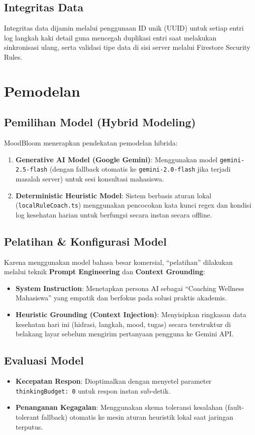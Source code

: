 \documentclass[12pt,a4paper]{article}
\begin{document}
\subsection{Integritas Data}
Integritas data dijamin melalui penggunaan ID unik (UUID) untuk setiap entri log langkah kaki detail guna mencegah duplikasi entri saat melakukan sinkronisasi ulang, serta validasi tipe data di sisi server melalui Firestore Security Rules.

\section{Pemodelan}

\subsection{Pemilihan Model (Hybrid Modeling)}
MoodBloom menerapkan pendekatan pemodelan hibrida:
\begin{enumerate}
    \item \textbf{Generative AI Model (Google Gemini)}: Menggunakan model \texttt{gemini-2.5-flash} (dengan fallback otomatis ke \texttt{gemini-2.0-flash} jika terjadi masalah server) untuk sesi konsultasi mahasiswa.
    \item \textbf{Deterministic Heuristic Model}: Sistem berbasis aturan lokal (\texttt{localRuleCoach.ts}) menggunakan pencocokan kata kunci regex dan kondisi log kesehatan harian untuk berfungsi secara instan secara offline.
\end{enumerate}

\subsection{Pelatihan \& Konfigurasi Model}
Karena menggunakan model bahasa besar komersial, ``pelatihan'' dilakukan melalui teknik \textbf{Prompt Engineering} dan \textbf{Context Grounding}:
\begin{itemize}
    \item \textbf{System Instruction}: Menetapkan persona AI sebagai ``Coaching Wellness Mahasiswa'' yang empatik dan berfokus pada solusi praktis akademis.
    \item \textbf{Heuristic Grounding (Context Injection)}: Menyisipkan ringkasan data kesehatan hari ini (hidrasi, langkah, mood, tugas) secara terstruktur di belakang layar sebelum mengirim pertanyaan pengguna ke Gemini API.
\end{itemize}

\subsection{Evaluasi Model}
\begin{itemize}
    \item \textbf{Kecepatan Respon}: Dioptimalkan dengan menyetel parameter \texttt{thinkingBudget: 0} untuk respon instan sub-detik.
    \item \textbf{Penanganan Kegagalan}: Menggunakan skema toleransi kesalahan (fault-tolerant fallback) otomatis ke mesin aturan heuristik lokal saat jaringan terputus.
\end{itemize}
\end{document}
